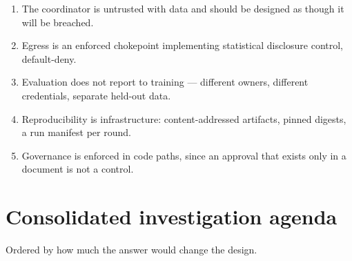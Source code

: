 \documentclass[11pt,a4paper]{article}
\begin{document}
\begin{enumerate}
  \item The coordinator is untrusted with data and should be designed as
  though it will be breached.
  \item Egress is an enforced chokepoint implementing statistical
  disclosure control, default-deny.
  \item Evaluation does not report to training --- different owners,
  different credentials, separate held-out data.
  \item Reproducibility is infrastructure: content-addressed artifacts,
  pinned digests, a run manifest per round.
  \item Governance is enforced in code paths, since an approval that exists
  only in a document is not a control.
\end{enumerate}

\section{Consolidated investigation agenda}
\label{sec:agenda}

Ordered by how much the answer would change the design.
\end{document}

